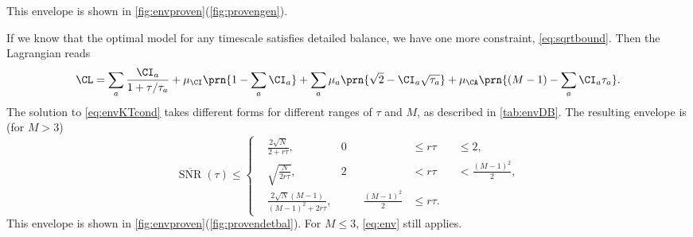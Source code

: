 \documentclass[12pt]{article}
\DeclareMathOperator{\snr}{SNR}
\newcommand{\snrb}{\overline{\snr}}
\begin{document}
This envelope is shown in \cref{fig:envproven}(\ref{fig:provengen}).

If we know that the optimal model for any timescale satisfies detailed balance, we have one more constraint, \cref{eq:sqrtbound}.
Then the Lagrangian reads
%
\begin{equation}\label{eq:envDBlagrangian}
  \CL = \sum_a \frac{\CI_a}{1+\tau/\tau_a} + \mu_\CI \prn{1 - \sum_a \CI_a} 
      + \sum_a \mu_a \prn{\sqrt{2} - \CI_a \sqrt{\tau_a}} + \mu_\CA \prn{(M-1) - \sum_a \CI_a \tau_a}.
\end{equation}
%
The solution to \cref{eq:envKTcond} takes different forms for different ranges of \(\tau\) and \(M\),
as described in \cref{tab:envDB}.
The resulting envelope is (for \(M > 3\))
%
\begin{equation}\label{eq:envDB}
  \snrb(\tau) \leq 
  \left\{ 
  \begin{alignedat}{3}
    &\frac{2 \sqrt{N}}{2 + r \tau}
      , &
      0 &\leq r \tau &&\leq 2
      , \\
    &\sqrt{\frac{N}{2 r \tau}}
      , &
      2 &< r \tau &&< \frac{(M-1)^2}{2}
      , \\
    &\frac{2 \sqrt{N} (M-1)}{(M-1)^2 + 2r \tau}
      , &\qquad
      \frac{(M-1)^2}{2} &\leq r \tau 
      .
  \end{alignedat}
  \right.
\end{equation}
%
This envelope is shown in \cref{fig:envproven}(\ref{fig:provendetbal}).
For \(M \leq 3\), \cref{eq:env} still applies.
\end{document}
